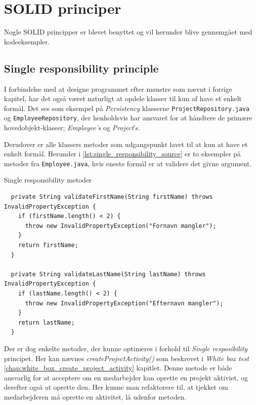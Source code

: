 \section{SOLID principer} \label{chap:solid}
Nogle SOLID principper er blevet benyttet og vil herunder blive gennemgået med kodeeksempler.

\subsection{Single responsibility principle} \label{sec:solid_s}
I forbindelse med at designe programmet efter mønstre som nævnt i forrige kapitel, har det også været naturligt at opdele klasser til kun af have et enkelt formål. Det ses som eksempel på \textit{Persistency} klasserne \texttt{ProjectRepository.java} og \texttt{EmployeeRepository}, der henholdsvis har ansvaret for at håndtere de primære hovedobjekt-klasser; \textit{Employee's} og \textit{Project}'s.

Derudover er alle klassers metoder som udgangspunkt lavet til at kun at have et enkelt formål. Herunder i \ref{lst:single_responsibility_source} er to eksempler på metoder fra \texttt{Employee.java}, hvis eneste formål er at validere det givne argument.
\begin{listing}[H]
    \centering
    \caption{Single responsibility metoder}\label{lst:single_responsibility_source}
    \begin{verbatim}
  private String validateFirstName(String firstName) throws InvalidPropertyException {
    if (firstName.length() < 2) {
      throw new InvalidPropertyException("Fornavn mangler");
    }
    return firstName;
  }

  private String validateLastName(String lastName) throws InvalidPropertyException {
    if (lastName.length() < 2) {
      throw new InvalidPropertyException("Efternavn mangler");
    }
    return lastName;
  }

    \end{verbatim}
\end{listing}
Der er dog enkelte metoder, der kunne optimeres i forhold til \textit{Single resposibility} principet. Her kan nævnes \textit{createProjectActivity()} som beskrevet i \textit{White box test} \ref{chap:white_box_create_project_activity} kapitlet. Denne metode er både ansvarlig for at acceptere om en medarbejder kan oprette en projekt aktiviet, og derefter også at oprette den. Her kunne man refaktorere til, at tjekket om medarbejderen må oprette en aktivitet, lå udenfor metoden.

